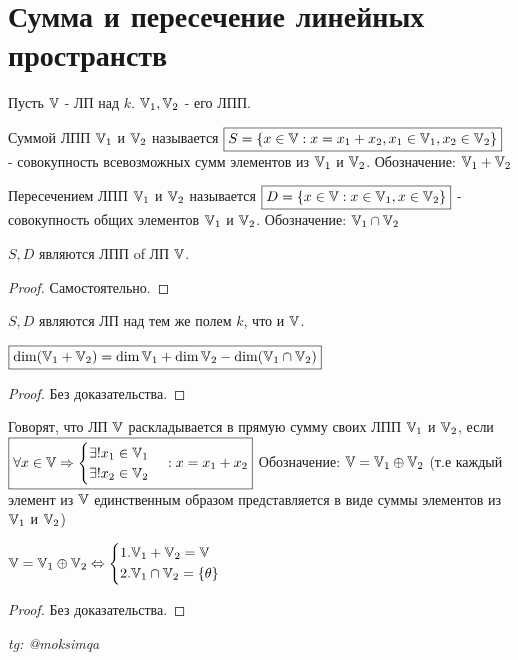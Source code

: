 \documentclass[../main.tex]{subfiles}
\begin{document}
\section{Сумма и пересечение линейных пространств}
Пусть $\mathbb{V}$ - ЛП над $k$. $\mathbb{V}_{1}, \mathbb{V}_{2}$ - его ЛПП. 
\begin{definition}
    Суммой ЛПП $\mathbb{V}_{1}$ и $\mathbb{V}_{2}$ называется $\fbox{$S=\{x\in\mathbb{V} : x= x_{1} + x_{2}, x_{1}\in \mathbb{V}_{1}, x_{2}\in \mathbb{V}_{2}\}$}$ - совокупность всевозможных сумм элементов из $\mathbb{V}_{1}$ и $\mathbb{V}_{2}$. Обозначение: $\mathbb{V}_{1}+\mathbb{V}_{2}$ 
\end{definition} 
\begin{definition} 
    Пересечением ЛПП $\mathbb{V}_{1}$ и $\mathbb{V}_{2}$ называется $\fbox{$D = \{x\in \mathbb{V} : x\in \mathbb{V}_{1}, x\in \mathbb{V}_{2}\}$}$ - совокупность общих элементов $\mathbb{V}_{1}$ и $\mathbb{V}_{2}$. Обозначение: $\mathbb{V}_{1}\cap \mathbb{V}_{2}$
\end{definition}
\begin{theorem}
    $S,D$ являются ЛПП of ЛП $\mathbb{V}$.
\end{theorem}
\begin{proof}
    Самостоятельно.
\end{proof}
\begin{corollary}
    $S,D$ являются ЛП над тем же полем $k$, что и $\mathbb{V}$.
\end{corollary}
\begin{theorem}[О размерности $S$ и $D$]
    $\fbox{$\dim(\mathbb{V}_{1}+\mathbb{V}_{2}) = \dim \mathbb{V}_{1} + \dim \mathbb{V}_{2} - \dim(\mathbb{V}_{1}\cap \mathbb{V}_{2})$}$
\end{theorem}
\begin{proof}
    Без доказательства.
\end{proof}
\begin{definition}
    Говорят, что ЛП $\mathbb{V}$ раскладывается в прямую сумму своих ЛПП $\mathbb{V}_{1}$ и $\mathbb{V}_{2}$, если\\ $\fbox{$\forall x \in \mathbb{V} \Rightarrow \begin{cases}
        \exists! x_{1}\in \mathbb{V}_{1} \\ 
        \exists! x_{2}\in \mathbb{V}_{2}
    \end{cases}: x = x_{1}+x_{2}$}$ Обозначение: $\mathbb{V} = \mathbb{V}_{1}\oplus \mathbb{V}_{2}$ (т.е каждый элемент из $\mathbb{V}$ единственным образом представляется в виде суммы элементов из $\mathbb{V}_{1}$ и $\mathbb{V}_{2}$)
\end{definition}
\begin{theorem}
    $\mathbb{V} = \mathbb{V}_{1}\oplus \mathbb{V}_{2} \Leftrightarrow \left\{\begin{aligned}
        &1. \mathbb{V}_{1}+\mathbb{V}_{2} = \mathbb{V}\\
        &2. \mathbb{V}_{1}\cap \mathbb{V}_{2} = \{\theta\}
    \end{aligned}\right.$
\end{theorem}
\begin{proof}
    Без доказательства.
\end{proof}




\vspace{1cm}
\begin{flushright}
    \textit{tg: @moksimqa}
\end{flushright}
\end{document}
